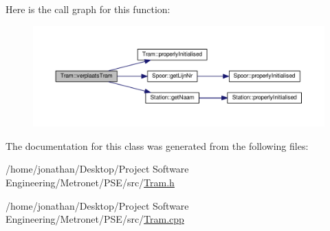 Here is the call graph for this function\+:
\nopagebreak
\begin{figure}[H]
\begin{center}
\leavevmode
\includegraphics[width=350pt]{class_tram_ab2a78d1ff86257b8dd27a3b0abc440ee_cgraph}
\end{center}
\end{figure}




The documentation for this class was generated from the following files\+:\begin{DoxyCompactItemize}
\item 
/home/jonathan/\+Desktop/\+Project Software Engineering/\+Metronet/\+P\+S\+E/src/\hyperlink{_tram_8h}{Tram.\+h}\item 
/home/jonathan/\+Desktop/\+Project Software Engineering/\+Metronet/\+P\+S\+E/src/\hyperlink{_tram_8cpp}{Tram.\+cpp}\end{DoxyCompactItemize}
